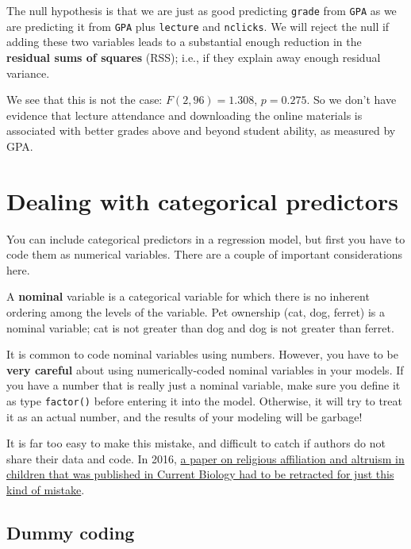 \documentclass[]{book}
\begin{document}
The null hypothesis is that we are just as good predicting \texttt{grade} from \texttt{GPA} as we are predicting it from \texttt{GPA} plus \texttt{lecture} and \texttt{nclicks}. We will reject the null if adding these two variables leads to a substantial enough reduction in the \textbf{residual sums of squares} (RSS); i.e., if they explain away enough residual variance.

We see that this is not the case:
\(F(2, 96 ) = 1.308\),
\(p = 0.275\). So we don't have evidence that lecture attendance and downloading the online materials is associated with better grades above and beyond student ability, as measured by GPA.

\hypertarget{dealing-with-categorical-predictors}{%
\section{Dealing with categorical predictors}\label{dealing-with-categorical-predictors}}

You can include categorical predictors in a regression model, but first you have to code them as numerical variables. There are a couple of important considerations here.

A \textbf{nominal} variable is a categorical variable for which there is no inherent ordering among the levels of the variable. Pet ownership (cat, dog, ferret) is a nominal variable; cat is not greater than dog and dog is not greater than ferret.

It is common to code nominal variables using numbers. However, you have to be \textbf{very careful} about using numerically-coded nominal variables in your models. If you have a number that is really just a nominal variable, make sure you define it as type \texttt{factor()} before entering it into the model. Otherwise, it will try to treat it as an actual number, and the results of your modeling will be garbage!

It is far too easy to make this mistake, and difficult to catch if authors do not share their data and code. In 2016, \href{https://www.sciencedirect.com/science/article/pii/S0960982216306704}{a paper on religious affiliation and altruism in children that was published in Current Biology had to be retracted for just this kind of mistake}.

\hypertarget{dummy-coding}{%
\subsection{Dummy coding}\label{dummy-coding}}
\end{document}
